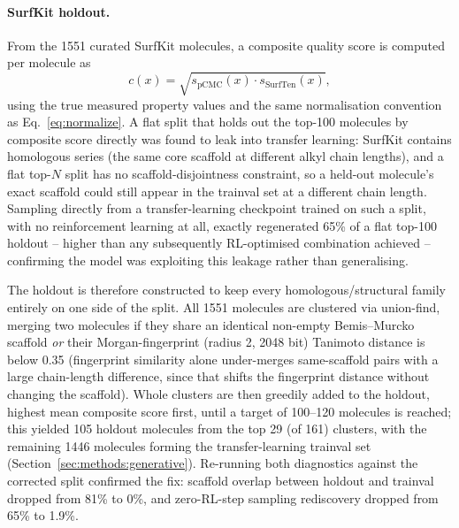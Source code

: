 \documentclass[11pt]{aime}
\begin{document}
\paragraph{SurfKit holdout.}
From the 1551 curated SurfKit molecules, a composite quality score is computed per molecule as
\begin{equation}
    c(x) = \sqrt{s_\mathrm{pCMC}(x)\cdot s_\mathrm{SurfTen}(x)},
    \label{eq:composite}
\end{equation}
using the true measured property values and the same normalisation convention as Eq.~\ref{eq:normalize}.
A flat split that holds out the top-100 molecules by composite score directly was found to leak into transfer learning: SurfKit contains homologous series (the same core scaffold at different alkyl chain lengths), and a flat top-$N$ split has no scaffold-disjointness constraint, so a held-out molecule's exact scaffold could still appear in the trainval set at a different chain length. Sampling directly from a transfer-learning checkpoint trained on such a split, with no reinforcement learning at all, exactly regenerated 65\% of a flat top-100 holdout -- higher than any subsequently RL-optimised combination achieved -- confirming the model was exploiting this leakage rather than generalising.

The holdout is therefore constructed to keep every homologous/structural family entirely on one side of the split. All 1551 molecules are clustered via union-find, merging two molecules if they share an identical non-empty Bemis--Murcko scaffold\cite{bemis_properties_1996} \emph{or} their Morgan-fingerprint\cite{rogers_extended-connectivity_2010} (radius 2, 2048 bit) Tanimoto distance is below 0.35 (fingerprint similarity alone under-merges same-scaffold pairs with a large chain-length difference, since that shifts the fingerprint distance without changing the scaffold). Whole clusters are then greedily added to the holdout, highest mean composite score first, until a target of 100--120 molecules is reached; this yielded 105 holdout molecules from the top 29 (of 161) clusters, with the remaining 1446 molecules forming the transfer-learning trainval set (Section~\ref{sec:methods:generative}). Re-running both diagnostics against the corrected split confirmed the fix: scaffold overlap between holdout and trainval dropped from 81\% to 0\%, and zero-RL-step sampling rediscovery dropped from 65\% to 1.9\%.
\end{document}
